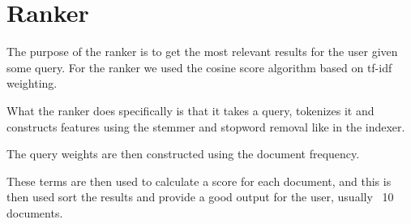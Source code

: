 	\section{Ranker}
	The purpose of the ranker is to get the most relevant results for the user given some query.
	For the ranker we used the cosine score algorithm based on tf-idf weighting.
	
	What the ranker does specifically is that it takes a query, tokenizes it and constructs features using the stemmer and stopword removal like in the indexer.
	
	The query weights are then constructed using the document frequency.
	
	These terms are then used to calculate a score for each document, and this is then used sort the results and provide a good output for the user, usually ~10 documents.
	


